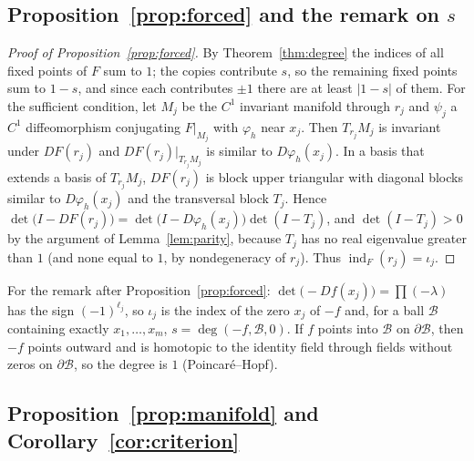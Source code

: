 \documentclass[aip,cha,reprint,amsmath,amssymb,longbibliography]{revtex4-2}
\theoremstyle{definition}
\newcommand{\ind}{\operatorname{ind}}
\begin{document}
\subsection{Proposition~\ref{prop:forced} and the remark on $s$}

\begin{proof}[Proof of Proposition~\ref{prop:forced}]
By Theorem~\ref{thm:degree} the indices of all fixed points of $F$ sum to $1$; the copies contribute $s$, so the remaining
fixed points sum to $1-s$, and since each contributes $\pm1$ there are at least $|1-s|$ of them. For the sufficient
condition, let $M_j$ be the $C^1$ invariant manifold through $r_j$ and $\psi_j$ a $C^1$ diffeomorphism conjugating
$F|_{M_j}$ with $\varphi_h$ near $x_j$. Then $T_{r_j}M_j$ is invariant under $DF(r_j)$ and $DF(r_j)|_{T_{r_j}M_j}$ is similar
to $D\varphi_h(x_j)$. In a basis that extends a basis of $T_{r_j}M_j$, $DF(r_j)$ is block upper triangular with diagonal
blocks similar to $D\varphi_h(x_j)$ and the transversal block $T_j$. Hence
$\det\bigl(I-DF(r_j)\bigr)=\det\bigl(I-D\varphi_h(x_j)\bigr)\det(I-T_j)$, and $\det(I-T_j)>0$ by the argument of
Lemma~\ref{lem:parity}, because $T_j$ has no real eigenvalue greater than $1$ (and none equal to $1$, by nondegeneracy of
$r_j$). Thus $\ind_F(r_j)=\iota_j$.
\end{proof}

For the remark after Proposition~\ref{prop:forced}: $\det\bigl(-Df(x_j)\bigr)=\prod(-\lambda)$ has the sign $(-1)^{\ell_j}$, so
$\iota_j$ is the index of the zero $x_j$ of $-f$ and, for a ball $\mathcal{B}$ containing exactly $x_1,\dots,x_m$,
$s=\deg(-f,\mathcal{B},0)$. If $f$ points into $\mathcal{B}$ on $\partial\mathcal{B}$, then $-f$ points outward and is
homotopic to the identity field through fields without zeros on $\partial\mathcal{B}$, so the degree is $1$
(Poincar\'e--Hopf).

\subsection{Proposition~\ref{prop:manifold} and Corollary~\ref{cor:criterion}}
\end{document}

